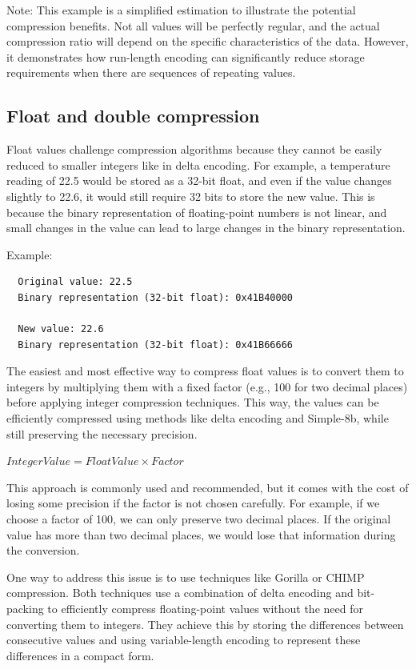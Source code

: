 Note: This example is a simplified estimation to illustrate the potential
compression benefits. Not all values will be perfectly regular, and the actual
compression ratio will depend on the specific characteristics of the data.
However, it demonstrates how run-length encoding can significantly reduce
storage requirements when there are sequences of repeating values.

\subsection{Float and double compression}\label{sec:float-compression}

Float values challenge compression algorithms because they cannot be easily
reduced to smaller integers like in delta encoding. For example, a temperature
reading of 22.5 would be stored as a 32-bit float, and even if the value
changes slightly to 22.6, it would still require 32 bits to store the new
value. This is because the binary representation of floating-point numbers is
not linear, and small changes in the value can lead to large changes in the
binary representation.

Example:

\begin{verbatim}
  Original value: 22.5
  Binary representation (32-bit float): 0x41B40000

  New value: 22.6
  Binary representation (32-bit float): 0x41B66666
\end{verbatim}

The easiest and most effective way to compress float values is to convert them
to integers by multiplying them with a fixed factor (e.g., 100 for two decimal
places) before applying integer compression techniques. This way, the values
can be efficiently compressed using methods like delta encoding and Simple-8b,
while still preserving the necessary precision.

$IntegerValue = FloatValue \times Factor$

This approach is commonly used and recommended, but it comes with the cost of
losing some precision if the factor is not chosen carefully. For example, if we
choose a factor of 100, we can only preserve two decimal places. If the
original value has more than two decimal places, we would lose that information
during the conversion.\cite{FloatTypes:01}

One way to address this issue is to use techniques like Gorilla or CHIMP
compression. Both techniques use a combination of delta encoding and
bit-packing to efficiently compress floating-point values without the need for
converting them to integers. They achieve this by storing the differences
between consecutive values and using variable-length encoding to represent
these differences in a compact form.


